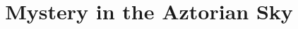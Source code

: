 \documentclass[11pt]{article}
\begin{document}
\ttfamily
\title{Mystery in the Aztorian Sky}
\maketitle
\end{document}
